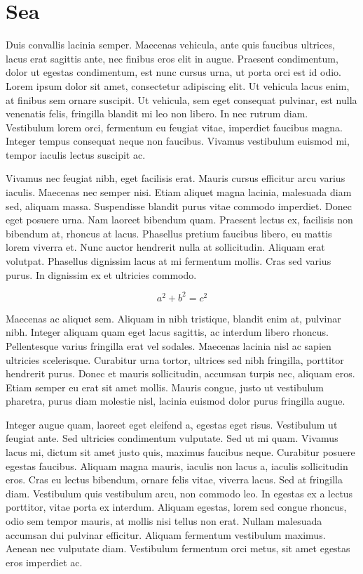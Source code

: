 \section[Spongebob Squarpants]{Sea}
	Duis convallis lacinia semper. Maecenas vehicula, ante quis faucibus ultrices, lacus erat sagittis ante, nec finibus eros elit in augue. Praesent condimentum, dolor ut egestas condimentum, est nunc cursus urna, ut porta orci est id odio. Lorem ipsum dolor sit amet, consectetur adipiscing elit. Ut vehicula lacus enim, at finibus sem ornare suscipit. Ut vehicula, sem eget consequat pulvinar, est nulla venenatis felis, fringilla blandit mi leo non libero. In nec rutrum diam. Vestibulum lorem orci, fermentum eu feugiat vitae, imperdiet faucibus magna. Integer tempus consequat neque non faucibus. Vivamus vestibulum euismod mi, tempor iaculis lectus suscipit ac.
	
	\twosq \twosq
	
	Vivamus nec feugiat nibh, eget facilisis erat. Mauris cursus efficitur arcu varius iaculis. Maecenas nec semper nisi. Etiam aliquet magna lacinia, malesuada diam sed, aliquam massa. Suspendisse blandit purus vitae commodo imperdiet. Donec eget posuere urna. Nam laoreet bibendum quam. Praesent lectus ex, facilisis non bibendum at, rhoncus at lacus. Phasellus pretium faucibus libero, eu mattis lorem viverra et. Nunc auctor hendrerit nulla at sollicitudin. Aliquam erat volutpat. Phasellus dignissim lacus at mi fermentum mollis. Cras sed varius purus. In dignissim ex et ultricies commodo.
	
	\begin{equation}
		a^2 + b^2 = c^2
	\end{equation}
	
	Maecenas ac aliquet sem. Aliquam in nibh tristique, blandit enim at, pulvinar nibh. Integer aliquam quam eget lacus sagittis, ac interdum libero rhoncus. Pellentesque varius fringilla erat vel sodales. Maecenas lacinia nisl ac sapien ultricies scelerisque. Curabitur urna tortor, ultrices sed nibh fringilla, porttitor hendrerit purus. Donec et mauris sollicitudin, accumsan turpis nec, aliquam eros. Etiam semper eu erat sit amet mollis. Mauris congue, justo ut vestibulum pharetra, purus diam molestie nisl, lacinia euismod dolor purus fringilla augue.
	
	Integer augue quam, laoreet eget eleifend a, egestas eget risus. Vestibulum ut feugiat ante. Sed ultricies condimentum vulputate. Sed ut mi quam. Vivamus lacus mi, dictum sit amet justo quis, maximus faucibus neque. Curabitur posuere egestas faucibus. Aliquam magna mauris, iaculis non lacus a, iaculis sollicitudin eros. Cras eu lectus bibendum, ornare felis vitae, viverra lacus. Sed at fringilla diam. Vestibulum quis vestibulum arcu, non commodo leo. In egestas ex a lectus porttitor, vitae porta ex interdum. Aliquam egestas, lorem sed congue rhoncus, odio sem tempor mauris, at mollis nisi tellus non erat. Nullam malesuada accumsan dui pulvinar efficitur. Aliquam fermentum vestibulum maximus. Aenean nec vulputate diam. Vestibulum fermentum orci metus, sit amet egestas eros imperdiet ac.
	
